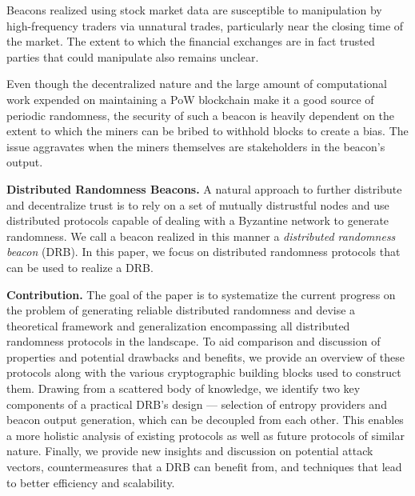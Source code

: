 \documentclass[letterpaper,twocolumn,10pt]{article}
\theoremstyle{definition}
\theoremstyle{remark}
\begin{document}
Beacons realized using stock market data are susceptible to manipulation by high-frequency traders via unnatural trades, particularly near the closing time of the market. The extent to which the financial exchanges are in fact trusted parties that could manipulate also remains unclear.

Even though the decentralized nature and the large amount of computational work expended on maintaining a PoW blockchain make it a good source of periodic randomness, the security of such a beacon is heavily dependent on the extent to which the miners can be bribed to withhold blocks to create a bias. The issue aggravates when the miners themselves are stakeholders in the beacon's output.

\textbf{Distributed Randomness Beacons.}
A natural approach to further distribute and decentralize trust is to rely on a set of mutually distrustful nodes and use distributed protocols capable of dealing with a Byzantine network to generate randomness. We call a beacon realized in this manner a \textit{distributed randomness beacon} (DRB). In this paper, we focus on distributed randomness protocols that can be used to realize a DRB.

\textbf{Contribution.} The goal of the paper is to systematize the current progress on the problem of generating reliable distributed randomness and devise a theoretical framework and generalization encompassing all distributed randomness protocols in the landscape. To aid comparison and discussion of properties and potential drawbacks and benefits, we provide an overview of these protocols along with the various cryptographic building blocks used to construct them. Drawing from a scattered body of knowledge, we identify two key components of a practical DRB's design --- selection of entropy providers and beacon output generation, which can be decoupled from each other. This enables a more holistic analysis of existing protocols as well as future protocols of similar nature. Finally, we provide new insights and discussion on potential attack vectors, countermeasures that a DRB can benefit from, and techniques that lead to better efficiency and scalability.
\end{document}

